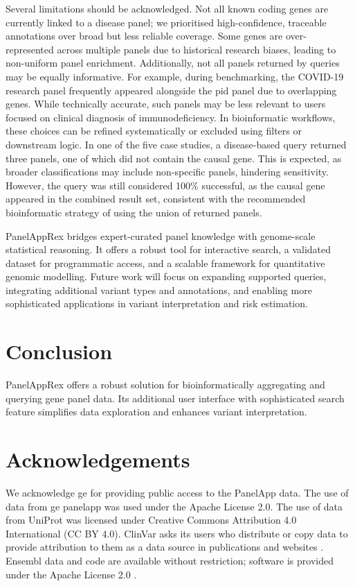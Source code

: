 Several limitations should be acknowledged. Not all known coding genes are currently linked to a disease panel; we prioritised high-confidence, traceable annotations over broad but less reliable coverage. 
Some genes are over-represented across multiple panels due to historical research biases, leading to non-uniform panel enrichment. 
Additionally, not all panels returned by queries may be equally informative. 
For example, during benchmarking, the COVID-19 research panel frequently appeared alongside the \ac{pid} panel due to overlapping genes. 
While technically accurate, such panels may be less relevant to users focused on clinical  diagnosis of immunodeficiency.
In bioinformatic workflows, these choices can be refined systematically or excluded using filters or downstream logic.
In one of the five case studies, a disease-based query returned three panels, one of which did not contain the causal gene. This is expected, as broader classifications may include non-specific panels, hindering sensitivity. However, the query was still considered 100\% successful, as the causal gene appeared in the combined result set, consistent with the recommended bioinformatic strategy of using the union of returned panels.

PanelAppRex bridges expert-curated panel knowledge with genome-scale statistical reasoning. 
It offers a robust tool for interactive search, a validated dataset for programmatic access, and a scalable framework for quantitative genomic modelling. 
Future work will focus on expanding supported queries, integrating additional variant types and annotations, and enabling more sophisticated applications in variant interpretation and risk estimation.

\section{Conclusion}
\noindent
PanelAppRex offers a robust solution for bioinformatically aggregating and querying gene panel data. Its additional user interface with sophisticated search feature simplifies data exploration and enhances variant interpretation. 

\section*{Acknowledgements}
\noindent
We acknowledge \ac{ge} for providing public access to the PanelApp data.
The use of data from \ac{ge} panelapp was used under the Apache License 2.0.
The use of data from UniProt was licensed under Creative Commons Attribution 4.0 International (CC BY 4.0).
ClinVar asks its users who distribute or copy data to provide attribution to them as a data source in publications and websites \cite{landrum_clinvar_2018}.
Ensembl data and code are available without restriction; software is provided under the Apache License 2.0 \cite{dyer_ensembl_2025}.

